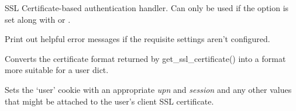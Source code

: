\documentclass[letterpaper,10pt,openany]{sphinxmanual}
\begin{document}
\begin{fulllineitems}
\label{Developer/authentication:gateone.auth.authentication.SSLAuthHandler}
SSL Certificate-based  authentication handler.  Can only be used if the
 option is set along with  or
.

\begin{fulllineitems}
\label{Developer/authentication:gateone.auth.authentication.SSLAuthHandler.initialize}
Print out helpful error messages if the requisite settings aren't
configured.

\end{fulllineitems}


\begin{fulllineitems}
\label{Developer/authentication:gateone.auth.authentication.SSLAuthHandler._convert_certificate}
Converts the certificate format returned by get\_ssl\_certificate() into
a format more suitable for a user dict.

\end{fulllineitems}


\begin{fulllineitems}
\label{Developer/authentication:gateone.auth.authentication.SSLAuthHandler.get}
Sets the `user' cookie with an appropriate \emph{upn} and \emph{session} and any
other values that might be attached to the user's client SSL
certificate.

\end{fulllineitems}


\end{fulllineitems}

\end{document}
